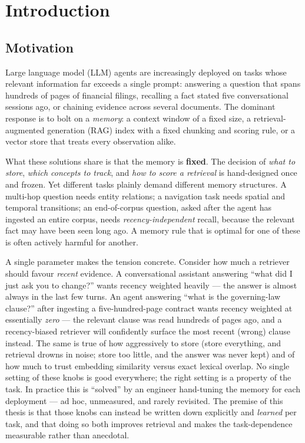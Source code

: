 \chapter{Introduction}
\label{ch:intro}

\section{Motivation}
Large language model (LLM) agents are increasingly deployed on tasks whose
relevant information far exceeds a single prompt: answering a question that
spans hundreds of pages of financial filings, recalling a fact stated five
conversational sessions ago, or chaining evidence across several documents. The
dominant response is to bolt on a \emph{memory}: a context window of a fixed
size, a retrieval-augmented generation (RAG) index with a fixed chunking and
scoring rule, or a vector store that treats every observation alike.

What these solutions share is that the memory is \textbf{fixed}. The decision of
\emph{what to store}, \emph{which concepts to track}, and \emph{how to score a
retrieval} is hand-designed once and frozen. Yet different tasks plainly demand
different memory structures. A multi-hop question needs entity relations; a
navigation task needs spatial and temporal transitions; an end-of-corpus
question, asked after the agent has ingested an entire corpus, needs
\emph{recency-independent} recall, because the relevant fact may have been seen
long ago. A memory rule that is optimal for one of these is often actively
harmful for another.

A single parameter makes the tension concrete. Consider how much a retriever
should favour \emph{recent} evidence. A conversational assistant answering
``what did I just ask you to change?'' wants recency weighted heavily --- the
answer is almost always in the last few turns. An agent answering ``what is the
governing-law clause?'' after ingesting a five-hundred-page contract wants recency
weighted at essentially \emph{zero} --- the relevant clause was read hundreds of
pages ago, and a recency-biased retriever will confidently surface the most
recent (wrong) clause instead. The same is true of how aggressively to store
(store everything, and retrieval drowns in noise; store too little, and the
answer was never kept) and of how much to trust embedding similarity versus exact
lexical overlap. No single setting of these knobs is good everywhere; the right
setting is a property of the task. In practice this is ``solved'' by an engineer
hand-tuning the memory for each deployment --- ad hoc, unmeasured, and rarely
revisited. The premise of this thesis is that those knobs can instead be written
down explicitly and \emph{learned} per task, and that doing so both improves
retrieval and makes the task-dependence measurable rather than anecdotal.

